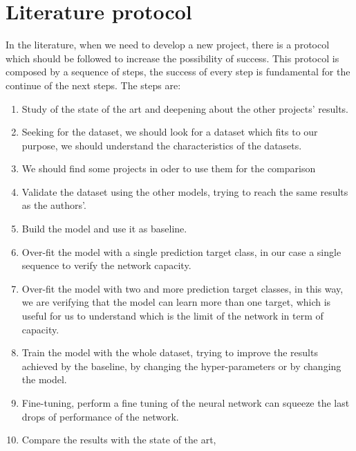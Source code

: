 \section{Literature protocol}\label{sec:literature-protocol}

In the literature, when we need to develop a new project, there is a protocol which should be followed to increase the possibility of success.
This protocol is composed by a sequence of steps, the success of every step is fundamental for the continue of the next steps.
The steps are:
\begin{enumerate}
    \item Study of the state of the art and deepening about the other projects' results.
    \item Seeking for the dataset, we should look for a dataset which fits to our purpose, we should understand the characteristics of the datasets.
    \item We should find some projects in oder to use them for the comparison
    \item Validate the dataset using the other models, trying to reach the same results as the authors'.
    \item Build the model and use it as baseline.
    \item Over-fit the model with a single prediction target class, in our case a single sequence to verify the network capacity.
    \item Over-fit the model with two and more prediction target classes, in this way, we are verifying that the model can learn more than one target, which is useful for us to understand which is the limit of the network in term of capacity.
    \item Train the model with the whole dataset, trying to improve the results achieved by the baseline, by changing the hyper-parameters or by changing the model.
    \item Fine-tuning, perform a fine tuning of the neural network can squeeze the last drops of performance of the network.
    \item Compare the results with the state of the art,
\end{enumerate}